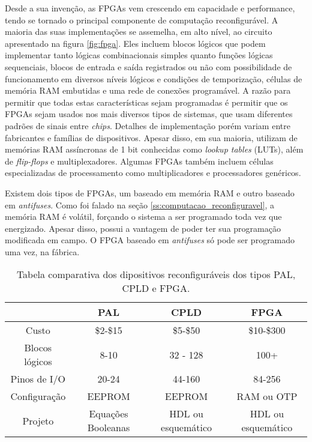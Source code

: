 \documentclass[11pt,a4paper,oneside]{book}
\begin{document}
Desde a sua inven\c{c}\~ao, as FPGAs vem crescendo em capacidade e performance, tendo se tornado o principal componente de computa\c{c}\~ao reconfigur\'avel.
A maioria das suas implementa\c{c}\~oes se assemelha, em alto n\'i­vel, ao circuito apresentado na figura \ref{fig:fpga}.
Eles incluem blocos l\'ogicos que podem implementar tanto l\'ogicas combinacionais simples quanto fun\c{c}\~oes l\'ogicas sequenciais, blocos de entrada e sa\'i­da registrados ou n\~ao com possibilidade de funcionamento em diversos n\'i­veis l\'ogicos e condi\c{c}\~oes de temporiza\c{c}\~ao, c\'elulas de mem\'oria RAM embutidas e uma rede de conex\~oes program\'avel.
A raz\~ao para permitir que todas estas caracter\'i­sticas sejam programadas \'e permitir que os FPGAs sejam usados nos mais diversos tipos de sistemas, que usam diferentes padr\~oes de sinais entre \textit{chips}.
Detalhes de implementa\c{c}\~ao por\'em variam entre fabricantes e fam\'i­lias de dispositivos.
Apesar disso, em sua maioria, utilizam de mem\'orias RAM ass\'i­ncronas de 1 bit conhecidas como \textit{lookup tables} (LUTs), al\'em de \textit{flip-flops} e multiplexadores.
Algumas FPGAs tamb\'em incluem c\'elulas especializadas de processamento como multiplicadores e processadores gen\'ericos.

Existem dois tipos de FPGAs, um baseado em mem\'oria RAM e outro baseado em \textit{antifuses}.
Como foi falado na se\c{c}\~ao \ref{ss:computacao_reconfiguravel}, a mem\'oria RAM \'e vol\'atil, for\c{c}ando o sistema a ser programado toda vez que energizado.
Apesar disso, possui a vantagem de poder ter sua programa\c{c}\~ao modificada em campo.
O FPGA baseado em \textit{antifuses} s\'o pode ser programado uma vez, na f\'abrica.

\begin{table}[h]
\centering
\begin{tabular}{|c|c|c|c|}
\hline
 & PAL & CPLD & FPGA \\ \hline
Custo & \$2-\$15 & \$5-\$50 & \$10-\$300 \\ \hline
Blocos l\'ogicos & 8-10 & 32 - 128 & 100+ \\ \hline
Pinos de I/O & 20-24 & 44-160 & 84-256\\ \hline
Configura\c{c}\~ao & EEPROM & EEPROM & RAM ou OTP\\ \hline
Projeto & Equa\c{c}\~oes Booleanas & HDL ou esquem\'atico & HDL ou esquem\'atico\\ \hline
\end{tabular}
\caption{Tabela comparativa dos dipositivos reconfigur\'aveis dos tipos PAL, CPLD e FPGA.}
\label{tab:comparacao}
\end{table}
\end{document}
